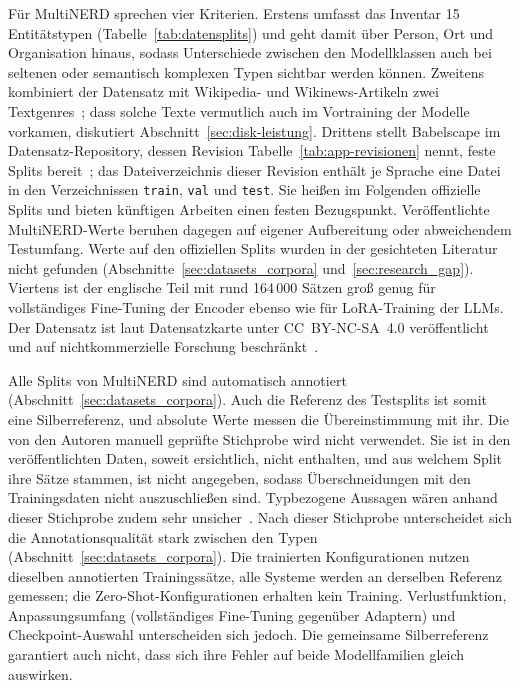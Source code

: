 Für MultiNERD sprechen vier Kriterien.
Erstens umfasst das Inventar 15 Entitätstypen
(Tabelle~\ref{tab:datensplits}) und geht damit über Person, Ort und
Organisation hinaus, sodass Unterschiede zwischen den Modellklassen auch
bei seltenen oder semantisch komplexen Typen sichtbar werden können.
Zweitens kombiniert der Datensatz mit Wikipedia- und Wikinews-Artikeln
zwei Textgenres~\cite{tedeschi2022multinerd}; dass solche Texte
vermutlich auch im Vortraining der Modelle vorkamen, diskutiert
Abschnitt~\ref{sec:disk-leistung}.
Drittens stellt Babelscape im Datensatz-Repository, dessen Revision
Tabelle~\ref{tab:app-revisionen} nennt, feste Splits
bereit~\cite{babelscape2023multinerdcard}; das Dateiverzeichnis dieser
Revision enthält je Sprache eine Datei in den Verzeichnissen
\texttt{train}, \texttt{val} und \texttt{test}. Sie
heißen im Folgenden offizielle Splits und bieten künftigen Arbeiten
einen festen Bezugspunkt.
Veröffentlichte MultiNERD-Werte beruhen dagegen auf eigener Aufbereitung
oder abweichendem Testumfang. Werte auf den offiziellen Splits wurden
in der gesichteten Literatur nicht gefunden
(Abschnitte~\ref{sec:datasets_corpora}
und~\ref{sec:research_gap}).
Viertens ist der englische Teil mit rund 164\,000 Sätzen groß genug für
vollständiges Fine-Tuning der Encoder ebenso wie für LoRA-Training der
LLMs.
Der Datensatz ist laut Datensatzkarte unter CC~BY-NC-SA~4.0
veröffentlicht und auf nichtkommerzielle Forschung beschränkt~\cite{babelscape2023multinerdcard}.

Alle Splits von MultiNERD sind automatisch annotiert
(Abschnitt~\ref{sec:datasets_corpora}). Auch die Referenz des Testsplits
ist somit eine Silberreferenz, und absolute Werte messen die
Übereinstimmung mit ihr.
Die von den Autoren manuell geprüfte Stichprobe wird nicht verwendet.
Sie ist in den veröffentlichten Daten, soweit ersichtlich, nicht
enthalten, und aus welchem
Split ihre Sätze stammen, ist nicht angegeben, sodass Überschneidungen
mit den Trainingsdaten nicht auszuschließen sind.
Typbezogene Aussagen wären anhand dieser Stichprobe zudem sehr unsicher~\cite[Tab.~5]{tedeschi2022multinerd}.
Nach dieser Stichprobe unterscheidet sich die Annotationsqualität stark
zwischen den Typen (Abschnitt~\ref{sec:datasets_corpora}).
Die trainierten Konfigurationen nutzen dieselben annotierten
Trainingssätze, alle Systeme werden an derselben Referenz gemessen;
die Zero-Shot-Konfigurationen erhalten kein Training.
Verlustfunktion, Anpassungsumfang (vollständiges Fine-Tuning gegenüber
Adaptern) und Checkpoint-Auswahl unterscheiden sich jedoch.
Die gemeinsame Silberreferenz garantiert auch nicht, dass sich ihre
Fehler auf beide Modellfamilien gleich auswirken.


